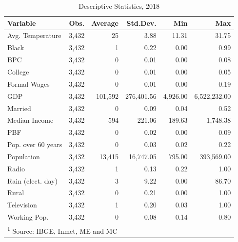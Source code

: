 \documentclass[12pt,]{article}
\begin{document}
\begin{table}[!h]

\caption{\label{tab:desc.2008}Descriptive Statistics, 2018}
\centering
\begin{tabular}{lrrrrr}
\toprule
Variable & Obs. & Average & Std.Dev. & Min & Max\\
\midrule
Avg. Temperature & 3,432 & 25 & 3.88 & 11.31 & 31.75\\
Black & 3,432 & 1 & 0.22 & 0.00 & 0.99\\
BPC & 3,432 & 0 & 0.01 & 0.00 & 0.08\\
College & 3,432 & 0 & 0.01 & 0.00 & 0.05\\
Formal Wages & 3,432 & 0 & 0.01 & 0.00 & 0.19\\
\addlinespace
GDP & 3,432 & 101,592 & 276,401.56 & 4,926.00 & 6,522,232.00\\
Married & 3,432 & 0 & 0.09 & 0.04 & 0.52\\
Median Income & 3,432 & 594 & 221.06 & 189.63 & 1,748.38\\
PBF & 3,432 & 0 & 0.02 & 0.00 & 0.09\\
Pop. over 60 years & 3,432 & 0 & 0.03 & 0.02 & 0.22\\
\addlinespace
Population & 3,432 & 13,415 & 16,747.05 & 795.00 & 393,569.00\\
Radio & 3,432 & 1 & 0.13 & 0.22 & 1.00\\
Rain (elect. day) & 3,432 & 3 & 9.22 & 0.00 & 86.70\\
Rural & 3,432 & 0 & 0.21 & 0.00 & 1.00\\
Television & 3,432 & 1 & 0.20 & 0.03 & 1.00\\
\addlinespace
Working Pop. & 3,432 & 0 & 0.08 & 0.14 & 0.80\\
\bottomrule
\multicolumn{6}{l}{\textsuperscript{1} Source: IBGE, Inmet, ME and MC}\\
\end{tabular}
\end{table}
\end{document}
